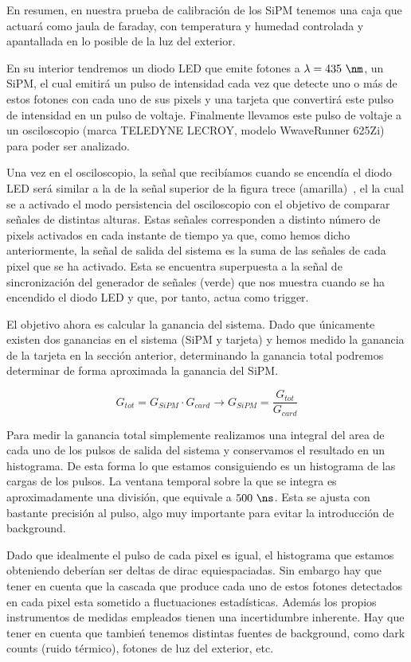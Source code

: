 En resumen, en nuestra prueba de calibración de los SiPM tenemos una caja que actuará como jaula de faraday, con temperatura y humedad controlada y apantallada en lo posible de la luz del exterior. 

En su interior tendremos un diodo LED que emite fotones a $\lambda=435~\nm$, un SiPM, el cual emitirá un pulso de intensidad cada vez que detecte uno o más de estos fotones con cada uno de sus pixels y una tarjeta que convertirá este pulso de intensidad en un pulso de voltaje. Finalmente llevamos este pulso de voltaje a un osciloscopio (marca TELEDYNE LECROY, modelo WwaveRunner 625Zi) para poder ser analizado. 

Una vez en el osciloscopio, la señal que recibíamos cuando se encendía el diodo LED será similar a la de la señal superior de la figura trece (amarilla)~\cite{inftec}, el la cual se a activado el modo persistencia del osciloscopio con el objetivo de comparar señales de distintas alturas. Estas señales corresponden a distinto número de pixels activados en cada instante de tiempo ya que, como hemos dicho anteriormente, la señal de salida del sistema es la suma de las señales de cada pixel que se ha activado. Esta se encuentra superpuesta a la señal de sincronización del generador de señales (verde) que nos muestra cuando se ha encendido el diodo LED y que, por tanto, actua como trigger.

El objetivo ahora es calcular la ganancia del sistema. Dado que únicamente existen dos ganancias en el sistema (SiPM y tarjeta) y hemos medido la ganancia de la tarjeta en la sección anterior, determinando la ganancia total podremos determinar de forma aproximada la ganancia del SiPM. 

\begin{equation}
G_{tot}=G_{SiPM} \cdotp G_{card} \longrightarrow G_{SiPM} = \frac{G_{tot}}{G_{card}}
\label{ganancias}
\end{equation}

Para medir la ganancia total simplemente realizamos una integral del area de cada uno de los pulsos de salida del sistema y conservamos el resultado en un histograma. De esta forma lo que estamos consiguiendo es un histograma de las cargas de los pulsos. La ventana temporal sobre la que se integra es aproximadamente una división, que equivale a $500~\ns$. Esta se ajusta con bastante precisión al pulso, algo muy importante para evitar la introducción de background.

Dado que idealmente el pulso de cada pixel es igual, el histograma que estamos obteniendo deberían ser deltas de dirac equiespaciadas. Sin embargo hay que tener en cuenta que la cascada que produce cada uno de estos fotones detectados en cada pixel esta sometido a fluctuaciones estadísticas. Además los propios instrumentos de medidas empleados tienen una incertidumbre inherente. Hay que tener en cuenta que tambień tenemos distintas fuentes de background, como dark counts (ruido térmico), fotones de luz del exterior, etc. 

